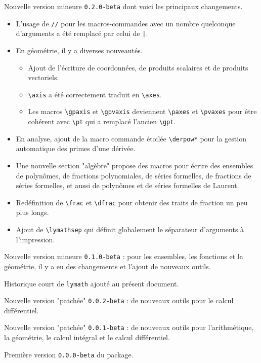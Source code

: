 \documentclass[12pt,a4paper]{scrartcl}
\theoremstyle{definition}
\begin{document}
\begin{description}[leftmargin=1em]
	\setlength\itemsep{1em}

	\item[2019-02-21] Nouvelle version mineure \verb+0.2.0-beta+ dont voici les principaux changements.
	\begin{itemize}
		\item L'usage de \verb+//+ pour les macros-commandes avec un nombre quelconque d'arguments a été remplacé par celui de \verb+|+.

		\item En géométrie, il y a diverses nouveautés.
		\begin{itemize}
			\item Ajout de l'écriture de coordonnées, de produits scalaires et de produits vectoriels.

			\item \verb+\axis+ a été correctement traduit en \verb+\axes+.

			\item Les macros \verb+\gpaxis+ et \verb+\gpvaxis+ deviennent \verb+\paxes+ et \verb+\pvaxes+ pour être cohérent avec \verb+\pt+ qui a remplacé l'ancien \verb+\gpt+.
		\end{itemize}

		\item En analyse, ajout de la macro commande étoilée \verb+\derpow*+ pour la gestion automatique des primes d'une dérivée.

		\item Une nouvelle section "algèbre" propose des macros pour écrire des ensembles de polynômes, de fractions polynomiales, de séries formelles, de fractions de séries formelles, et aussi de polynômes et de séries formelles de Laurent.

		\item Redéfinition de \verb+\frac+ et \verb+\dfrac+ pour obtenir des traits de fraction un peu plus longs.

		\item Ajout de \verb+\lymathsep+ qui définit globalement le séparateur d'arguments à l'impression.
	\end{itemize}


	\item[2017-11-01] Nouvelle version mineure \verb+0.1.0-beta+ : pour les ensembles, les fonctions et la géométrie, il y a eu des changements et l'ajout de nouveaux outils.


	\item[2017-10-21] Historique court de \verb+lymath+ ajouté au présent document.


	\item[2017-10-18] Nouvelle version "patchée" \verb+0.0.2-beta+ : de nouveaux outils pour le calcul différentiel.


	\item[2017-10-06] Nouvelle version "patchée" \verb+0.0.1-beta+ : de nouveaux outils pour l'arithmétique, la géométrie, le calcul intégral et le calcul différentiel.


	\item[2017-10-02] Première version \verb+0.0.0-beta+ du package.
\end{description}
\end{document}
